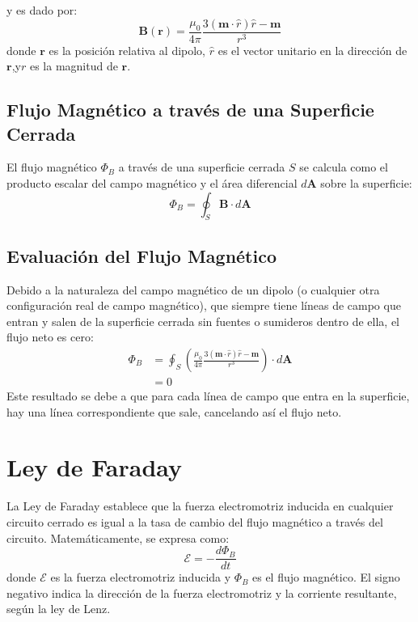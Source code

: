 \documentclass{article}
\begin{document}
	
	y es dado por:
	\begin{equation}
		\mathbf{B}(\mathbf{r}) = \frac{\mu_0}{4\pi} \frac{3(\mathbf{m} \cdot \hat{r})\hat{r} - \mathbf{m}}{r^3}
	\end{equation}
	donde \(\mathbf{r}\) es la posición relativa al dipolo,
	\(\hat{r}\) es el vector unitario en la dirección de \(\mathbf{r}\),y\(r\) es la magnitud de \(\mathbf{r}\).
	
	\subsection{Flujo Magnético a través de una Superficie Cerrada}
	El flujo magnético \(\Phi_B\) a través de una superficie cerrada \(S\) se calcula como el producto escalar del campo magnético y el área diferencial \(d\mathbf{A}\) sobre la superficie:
	\begin{equation}
		\Phi_B = \oint_S \mathbf{B} \cdot d\mathbf{A}
	\end{equation}
	
	\subsection{Evaluación del Flujo Magnético}
	Debido a la naturaleza del campo magnético de un dipolo (o cualquier otra configuración real de campo magnético), que siempre tiene líneas de campo que entran y salen de la superficie cerrada sin fuentes o sumideros dentro de ella, el flujo neto es cero:
	\begin{align}
		\Phi_B & = \oint_S \left(\frac{\mu_0}{4\pi} \frac{3(\mathbf{m} \cdot \hat{r})\hat{r} - \mathbf{m}}{r^3}\right) \cdot d\mathbf{A} \\
		& = 0
	\end{align}
	Este resultado se debe a que para cada línea de campo que entra en la superficie, hay una línea correspondiente que sale, cancelando así el flujo neto.
	
	\section{Ley de Faraday}
	La Ley de Faraday establece que la fuerza electromotriz inducida en cualquier circuito cerrado es igual a la tasa de cambio del flujo magnético a través del circuito. Matemáticamente, se expresa como:
	\begin{equation}
		\mathcal{E} = -\frac{d\Phi_B}{dt}
	\end{equation}
	donde \(\mathcal{E}\) es la fuerza electromotriz inducida y \(\Phi_B\) es el flujo magnético. El signo negativo indica la dirección de la fuerza electromotriz y la corriente resultante, según la ley de Lenz.
	
\end{document}
